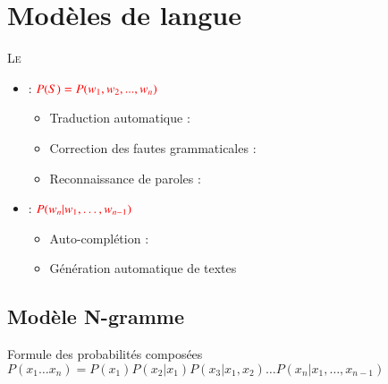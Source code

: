 \documentclass{KodeBook}
\begin{document}
		\mainmatter
	
\fi
\chapter{Modèles de langue}

\begin{introduction}
	\lettrine{L}{e} 
\end{introduction} 

\begin{itemize}
	\item {} : $\color{red} P(S) = P(w_1, w_2, ..., w_n) $
	\begin{itemize}
		\item Traduction automatique : \\
		\item Correction des fautes grammaticales : \\
		\item Reconnaissance de paroles : \\
	\end{itemize}
	\item {} : $\color{red} P(w_n | w_1, \ldots, w_{n-1}) $
	\begin{itemize}
		\item Auto-complétion : \\
		\item Génération automatique de textes
	\end{itemize}
\end{itemize}


\section{Modèle N-gramme}

\begin{block}{Formule des probabilités composées}
	$ P(x_1 \ldots x_n) =  P(x_1) P(x_2 | x_1) P(x_3 | x_1, x_2) \ldots P(x_n | x_1, \ldots, x_{n-1})$
\end{block}
\end{document}
